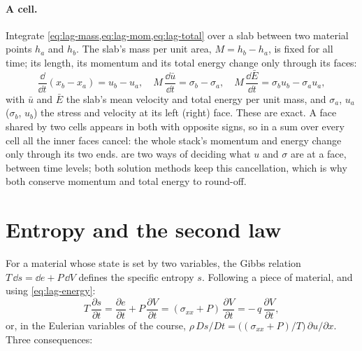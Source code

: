 \paragraph{A cell.} Integrate \cref{eq:lag-mass,eq:lag-mom,eq:lag-total}
over a slab between two material points $h_a$ and $h_b$. The slab's mass
per unit area, $M = h_b - h_a$, is fixed for all time; its length, its
momentum and its total energy change only through its faces:
\begin{equation}
\frac{\dd}{\dd t}(x_b - x_a) = u_b - u_a,
\quad
M\,\frac{\dd \bar u}{\dd t} = \sigma_b - \sigma_a,
\quad
M\,\frac{\dd \bar E}{\dd t} = \sigma_b u_b - \sigma_a u_a,
\label{eq:cm-cell}
\end{equation}
with $\bar u$ and $\bar E$ the slab's mean velocity and total energy per
unit mass, and $\sigma_a$, $u_a$ ($\sigma_b$, $u_b$) the stress and
velocity at its left (right) face. These are exact. A face shared by two
cells appears in both with opposite signs, so in a sum over every cell all
the inner faces cancel: the whole stack's momentum and energy change only
through its two ends.  are two ways of
deciding what $u$ and $\sigma$ are at a face, between time levels; both
solution methods keep this cancellation, which is why both conserve momentum and total
energy to round-off.

\section{Entropy and the second law}
\label{sec:entropy}

For a material whose state is set by two variables, the Gibbs relation
$T\,\dd s = \dd e + P\,\dd V$ defines the specific entropy $s$. Following a
piece of material, and using \cref{eq:lag-energy}:
\begin{equation}
T\,\frac{\partial s}{\partial t}
  = \frac{\partial e}{\partial t} + P\,\frac{\partial V}{\partial t}
  = (\sigma_{xx} + P)\,\frac{\partial V}{\partial t}
  = -\,q\,\frac{\partial V}{\partial t},
\label{eq:cm-entropy}
\end{equation}
or, in the Eulerian variables of the course, $\rho\,Ds/Dt = \bigl((\sigma_{xx}
+ P)/T\bigr)\,\partial u/\partial x$. Three consequences:

